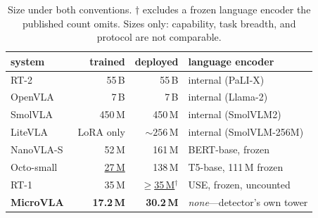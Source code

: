 \documentclass[10pt,letterpaper]{article}
\begin{document}
\begin{table}[h]\centering\small
\caption{Size under both conventions. $\dagger$ excludes a frozen language
encoder the published count omits. Sizes only: capability, task breadth, and
protocol are not comparable.}
\label{tab:size}
\begin{tabular}{lrrl}
\toprule
system & trained & deployed & language encoder \\
\midrule
RT-2~\citep{brohan2023rt2}        & 55\,B & 55\,B & internal (PaLI-X) \\
OpenVLA~\citep{kim2024openvla}    & 7\,B  & 7\,B  & internal (Llama-2) \\
SmolVLA~\citep{shukor2025smolvla} & 450\,M & 450\,M & internal (SmolVLM2) \\
LiteVLA~\citep{litevla2025}       & LoRA only & ${\sim}256$\,M & internal (SmolVLM-256M) \\
NanoVLA-S~\citep{nanovla2025}     & 52\,M & 161\,M & BERT-base, frozen \\
Octo-small~\citep{octo2024}       & \underline{27\,M} & 138\,M & T5-base, 111\,M frozen \\
RT-1~\citep{brohan2022rt1}        & 35\,M & \underline{$\ge$35\,M}$^\dagger$ & USE, frozen, uncounted \\
\midrule
\textbf{MicroVLA}                 & \textbf{17.2\,M} & \textbf{30.2\,M} & \emph{none}---detector's own tower \\
\bottomrule
\end{tabular}
\end{table}
\end{document}
